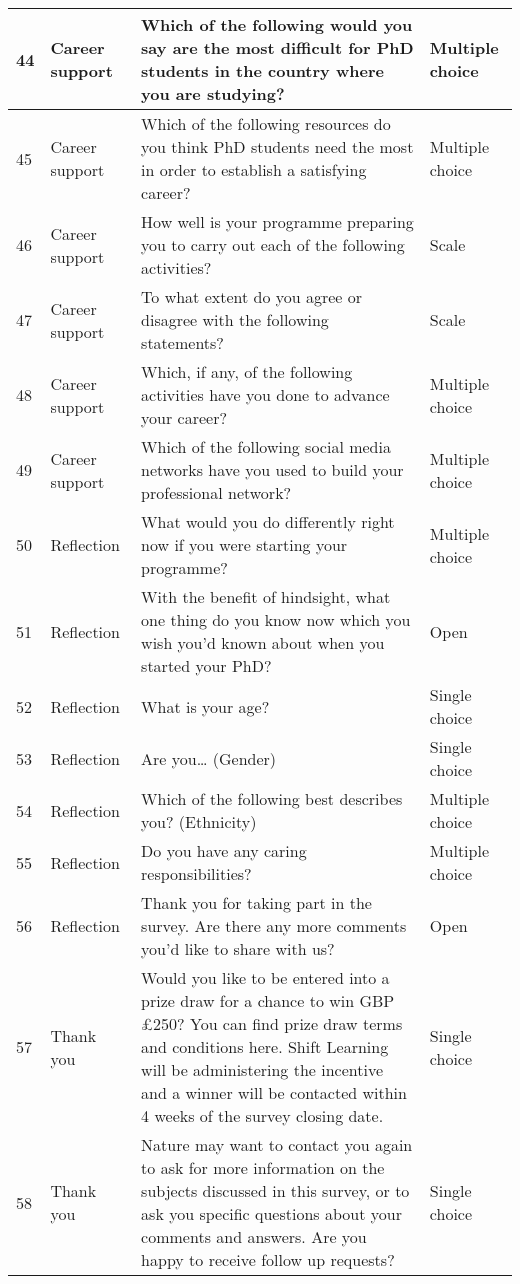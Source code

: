 \documentclass[
]{article}
\begin{document}
\begin{table}[H]
\begin{tabular}{l|l|l|l}
\hline
44 & Career support & Which of the following would you say are the most difficult for PhD students in the country where you are studying? & Multiple choice\\
\hline
45 & Career support & Which of the following resources do you think PhD students need the most in order to establish a satisfying career? & Multiple choice\\
\hline
46 & Career support & How well is your programme preparing you to carry out each of the following activities? & Scale\\
\hline
47 & Career support & To what extent do you agree or disagree with the following statements? & Scale\\
\hline
48 & Career support & Which, if any, of the following activities have you done to advance your career? & Multiple choice\\
\hline
49 & Career support & Which of the following social media networks have you used to build your professional network? & Multiple choice\\
\hline
50 & Reflection & What would you do differently right now if you were starting your programme? & Multiple choice\\
\hline
51 & Reflection & With the benefit of hindsight, what one thing do you know now which you wish you’d known about when you started your PhD? & Open\\
\hline
52 & Reflection & What is your age? & Single choice\\
\hline
53 & Reflection & Are you… (Gender) & Single choice\\
\hline
54 & Reflection & Which of the following best describes you? (Ethnicity) & Multiple choice\\
\hline
55 & Reflection & Do you have any caring responsibilities? & Multiple choice\\
\hline
56 & Reflection & Thank you for taking part in the survey. Are there any more comments you’d like to share with us? & Open\\
\hline
57 & Thank you & Would you like to be entered into a prize draw for a chance to win GBP £250? You can find prize draw terms and conditions here. Shift Learning will be administering the incentive and a winner will be contacted within 4 weeks of the survey closing date. & Single choice\\
\hline
58 & Thank you & Nature may want to contact you again to ask for more information on the subjects discussed in this survey, or to ask you specific questions about your comments and answers. Are you happy to receive follow up requests? & Single choice\\

\end{tabular}
\end{table}
\end{document}
